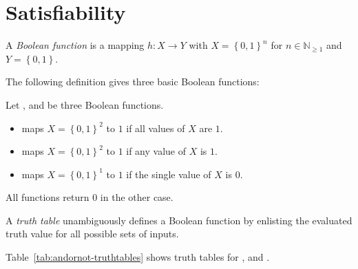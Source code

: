 \section{Satisfiability}
\label{sec:intro-sat}
%
\begin{defi}
  A \emph{Boolean function} is a mapping $h: X \to Y$ with $X = \left\{0,1\right\}^n$
  for $n \in \mathbb N_{\geq 1}$ and $Y = \left\{0,1\right\}$.
\end{defi}

The following definition gives three basic Boolean functions:

\begin{defi}
  Let ,  and  be three Boolean functions.
  \begin{itemize}[noitemsep,topsep=0pt]
    \item
       maps $X = \left\{0,1\right\}^2$
      to $1$ if all values of $X$ are $1$.
    \item
       maps $X = \left\{0,1\right\}^2$
      to $1$ if any value of $X$ is $1$.
    \item
       maps $X = \left\{0,1\right\}^1$
      to $1$ if the single value of $X$ is $0$.
  \end{itemize}
  All functions return $0$ in the other case.
\end{defi}

\begin{defi}
  A \emph{truth table} unambiguously defines a Boolean function
  by enlisting the evaluated truth value for all possible sets of
  inputs.

  Table~\ref{tab:andornot-truthtables} shows truth tables for
  ,  and .
\end{defi}

